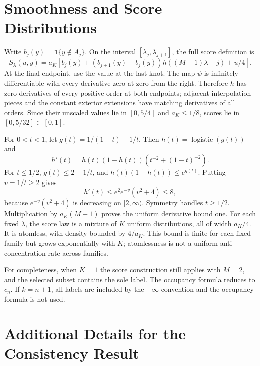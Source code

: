 \documentclass{article}
\newcommand{\ind}{\mathbf 1}
\begin{document}



\newpage
\appendix
\onecolumn
\section{Smoothness and Score Distributions}\label{app:smooth}

Write $b_j(y)=\ind\{y\notin A_j\}$. On the interval $[\lambda_j,\lambda_{j+1}]$, the full score definition is
\begin{equation}
 S_\lambda(u,y)=a_K\left[b_j(y)+(b_{j+1}(y)-b_j(y))h((M-1)\lambda-j)+u/4\right].
\end{equation}
At the final endpoint, use the value at the last knot. The map $\psi$ is infinitely differentiable with every derivative zero at zero from the right. Therefore $h$ has zero derivatives of every positive order at both endpoints; adjacent interpolation pieces and the constant exterior extensions have matching derivatives of all orders. Since their unscaled values lie in $[0,5/4]$ and $a_K\le1/8$, scores lie in $[0,5/32]\subset[0,1]$.

For $0<t<1$, let $g(t)=1/(1-t)-1/t$. Then $h(t)=\operatorname{logistic}(g(t))$ and
\begin{equation}
 h'(t)=h(t)(1-h(t))\left(t^{-2}+(1-t)^{-2}\right).
\end{equation}
For $t\le1/2$, $g(t)\le2-1/t$, and $h(t)(1-h(t))\le e^{g(t)}$. Putting $v=1/t\ge2$ gives
\begin{equation}
 h'(t)\le e^2 e^{-v}(v^2+4)\le8,
\end{equation}
because $e^{-v}(v^2+4)$ is decreasing on $[2,\infty)$. Symmetry handles $t\ge1/2$. Multiplication by $a_K(M-1)$ proves the uniform derivative bound one. For each fixed $\lambda$, the score law is a mixture of $K$ uniform distributions, all of width $a_K/4$. It is atomless, with density bounded by $4/a_K$. This bound is finite for each fixed family but grows exponentially with $K$; atomlessness is not a uniform anti-concentration rate across families.

For completeness, when $K=1$ the score construction still applies with $M=2$, and the selected subset contains the sole label. The occupancy formula reduces to $c_n$. If $k=n+1$, all labels are included by the $+\infty$ convention and the occupancy formula is not used.

\section{Additional Details for the Consistency Result}
\end{document}
